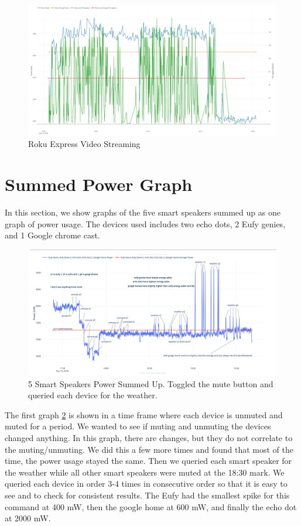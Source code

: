 \begin{figure}[H]
  \centering
  \includegraphics[width=1\textwidth]{figures/rokuStreaming.png}
  \caption{Roku Express Video Streaming}
  \label{fig:rokuStreaming}
\end{figure}

\section{Summed Power Graph}
\label{sumPowerGraph}
In this section, we show graphs of the five smart speakers summed up as one graph of power usage. The devices used includes two echo dots, 2 Eufy genies, and 1 Google chrome cast.

\begin{figure}[H]
  \centering
  \includegraphics[width=1\textwidth]{figures/weatherSum.png}
  \caption{5 Smart Speakers Power Summed Up. Toggled the mute button and queried each device for the weather.}
  \label{fig:weatherSum}
\end{figure}

The first graph \ref{fig:weatherSum} is shown in a time frame where each device is unmuted and muted for a period. We wanted to see if muting and unmuting the devices changed anything. In this graph, there are changes, but they do not correlate to the muting/unmuting. We did this a few more times and found that most of the time, the power usage stayed the same. Then we queried each smart speaker for the weather while all other smart speakers were muted at the 18:30 mark. We queried each device in order 3-4 times in consecutive order so that it is easy to see and to check for consistent results. The Eufy had the smallest spike for this command at 400 mW, then the google home at 600 mW, and finally the echo dot at 2000 mW.

